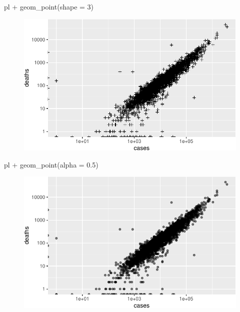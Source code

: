 \documentclass[
  letterpaper,
  DIV=11,
  numbers=noendperiod]{scrreprt}
\newenvironment{Shaded}{\begin{snugshade}}{\end{snugshade}}
\newcommand{\AttributeTok}[1]{\textcolor[rgb]{0.40,0.45,0.13}{#1}}
\newcommand{\DecValTok}[1]{\textcolor[rgb]{0.68,0.00,0.00}{#1}}
\newcommand{\FloatTok}[1]{\textcolor[rgb]{0.68,0.00,0.00}{#1}}
\newcommand{\FunctionTok}[1]{\textcolor[rgb]{0.28,0.35,0.67}{#1}}
\newcommand{\NormalTok}[1]{\textcolor[rgb]{0.00,0.23,0.31}{#1}}
\newcommand{\SpecialCharTok}[1]{\textcolor[rgb]{0.37,0.37,0.37}{#1}}
\begin{document}
\begin{Shaded}
\begin{Highlighting}[]
\NormalTok{pl }\SpecialCharTok{+} \FunctionTok{geom\_point}\NormalTok{(}\AttributeTok{shape =} \DecValTok{3}\NormalTok{)}
\end{Highlighting}
\end{Shaded}

\begin{figure}[H]

{\centering \includegraphics{./01-dataviz_files/figure-pdf/unnamed-chunk-25-3.pdf}

}

\end{figure}

\begin{Shaded}
\begin{Highlighting}[]
\NormalTok{pl }\SpecialCharTok{+} \FunctionTok{geom\_point}\NormalTok{(}\AttributeTok{alpha =} \FloatTok{0.5}\NormalTok{)}
\end{Highlighting}
\end{Shaded}

\begin{figure}[H]

{\centering \includegraphics{./01-dataviz_files/figure-pdf/unnamed-chunk-25-4.pdf}

}

\end{figure}
\end{document}
